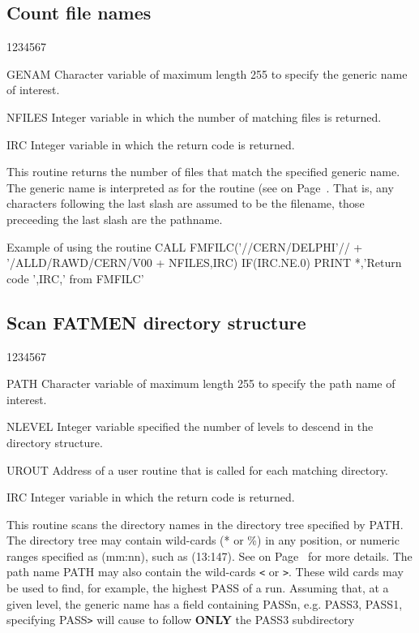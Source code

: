 \subsection{Count file names}
\begin{DLtt}{1234567}
\item[GENAM]
Character variable of maximum length 255 to specify the generic
name of  interest.
\item[NFILES]
Integer variable in which the number of matching files is returned.
\item[IRC]
Integer variable in which the return code is returned.
\end{DLtt}
\par
This routine returns the number of files that match the specified
generic name. The generic name is interpreted as for the
 routine (see on Page~\pageref{FMLS}. That is,
any characters following the last slash are assumed to be
the filename, those preceeding the last slash are the pathname.
\begin{XMPt}{Example of using the \protect{} routine}
      CALL FMFILC('//CERN/DELPHI'//
     +            '/ALLD/RAWD/CERN/V00%
     +            NFILES,IRC)
      IF(IRC.NE.0) PRINT *,'Return code ',IRC,' from FMFILC'
\end{XMPt}
\subsection{Scan FATMEN directory structure}
\begin{DLtt}{1234567}
\item[PATH]
Character variable of maximum length 255 to specify the path name of
interest.
\item[NLEVEL]
Integer variable specified the number of levels to descend in the directory
structure. 
\item[UROUT]
Address of a user routine that is called for each matching directory.
\item[IRC]
Integer variable in which the return code is returned.
\end{DLtt}
\par
This routine scans the directory names
in the directory tree specified by PATH.
The directory tree may contain wild-cards (* or \%) in any position,
or numeric ranges specified as (mm:nn), such as (13:147).
See on Page~\pageref{FMATCH} for more details.
The path name
PATH may also contain the wild-cards {\tt<} or {\tt>}. These wild cards
may be used to find, for example, the highest PASS of a run.
Assuming that, at a given level, the generic name has a field
containing PASSn, e.g. PASS3, PASS1, specifying PASS{\tt>} will
cause  to follow {\bf ONLY} the PASS3 subdirectory

